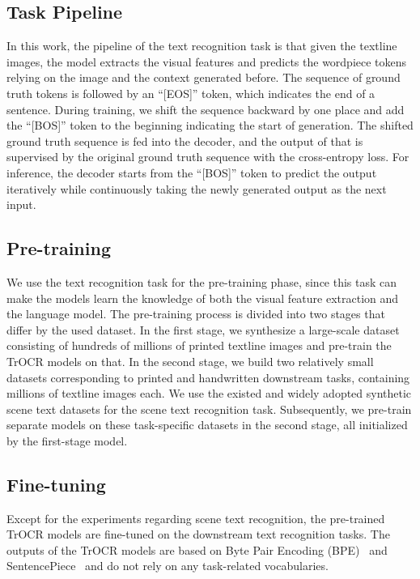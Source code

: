 \documentclass[letterpaper]{article} \usepackage{aaai23}  \usepackage{times}  \usepackage{helvet}  \usepackage{courier}  \usepackage[hyphens]{url}  \usepackage{graphicx} \urlstyle{rm} \def\UrlFont{\rm}  \usepackage{natbib}  \usepackage{caption} \frenchspacing  \setlength{\pdfpagewidth}{8.5in} \setlength{\pdfpageheight}{11in} \usepackage{algorithm}
\begin{document}
\subsection{Task Pipeline}
In this work, the pipeline of the text recognition task is that given the textline images, the model extracts the visual features and predicts the wordpiece tokens relying on the image and the context generated before.
The sequence of ground truth tokens is followed by an ``[EOS]'' token, which indicates the end of a sentence. During training, we shift the sequence backward by one place and add the ``[BOS]'' token to the beginning indicating the start of generation. The shifted ground truth sequence is fed into the decoder, and the output of that is supervised by the original ground truth sequence with the cross-entropy loss. For inference, the decoder starts from the ``[BOS]'' token to predict the output iteratively while continuously taking the newly generated output as the next input.



\subsection{Pre-training}
We use the text recognition task for the pre-training phase, since this task can make the models learn the knowledge of both the visual feature extraction and the language model. The pre-training process is divided into two stages that differ by the used dataset. In the first stage, we synthesize a large-scale dataset consisting of hundreds of millions of printed textline images and pre-train the TrOCR models on that. 
In the second stage, we build two relatively small datasets corresponding to printed and handwritten downstream tasks, containing millions of textline images each. We use the existed and widely adopted synthetic scene text datasets for the scene text recognition task. 
Subsequently, we pre-train separate models on these task-specific datasets in the second stage, all initialized by the first-stage model. 



\subsection{Fine-tuning}
Except for the experiments regarding scene text recognition, the pre-trained TrOCR models are fine-tuned on the downstream text recognition tasks. The outputs of the TrOCR models are based on Byte Pair Encoding (BPE)~\cite{sennrich2015neural} and SentencePiece~\cite{kudo2018sentencepiece} and do not rely on any task-related vocabularies. 
\end{document}
